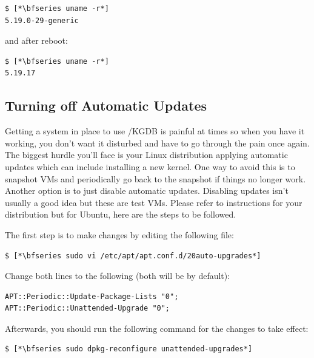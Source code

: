 \begin{lstlisting}
$ [*\bfseries uname -r*]
5.19.0-29-generic
\end{lstlisting}

\noindent
and after reboot:

\begin{lstlisting}
$ [*\bfseries uname -r*]
5.19.17
\end{lstlisting}


\subsection{Turning off Automatic Updates}\label{debug-noupdates}

Getting a system in place to use /KGDB is painful at times so when you have it working, you don't want it disturbed and have to go through the pain once again. The biggest hurdle you'll face is your Linux distribution applying automatic updates which can include installing a new kernel. One way to avoid this is to snapshot VMs and periodically go back to the snapshot if things no longer work. Another option is to just disable automatic updates. Disabling updates isn't usually a good idea but these are test VMs. Please refer to instructions for your distribution but for Ubuntu, here are the steps to be followed.

The first step is to make changes by editing the following file:

\begin{lstlisting}
$ [*\bfseries sudo vi /etc/apt/apt.conf.d/20auto-upgrades*]
\end{lstlisting}

\noindent
Change both lines to the following (both will be  by default):

\begin{lstlisting}
APT::Periodic::Update-Package-Lists "0";
APT::Periodic::Unattended-Upgrade "0";
\end{lstlisting}

\noindent
Afterwards, you should run the following command for the changes to take effect:

\begin{lstlisting}
$ [*\bfseries sudo dpkg-reconfigure unattended-upgrades*]
\end{lstlisting}

